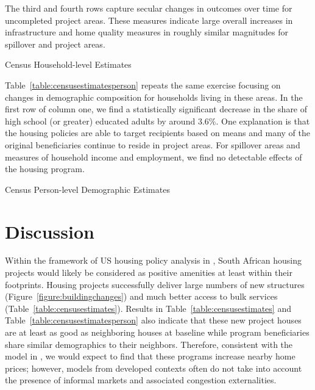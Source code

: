 \documentclass[12pt]{article}
\begin{document}
The third and fourth rows capture secular changes in outcomes over time for uncompleted project areas.  These measures indicate large overall increases in infrastructure and home quality measures in roughly similar magnitudes for spillover and project areas.

\begin{table}
\caption{Census Household-level Estimates}\label{table:censusestimates}
\centering
\begin{adjustbox}{angle=90}
\resizebox{\textheight}{!}{  

}
\end{adjustbox}
\end{table}

Table~\ref{table:censusestimatesperson} repeats the same exercise focusing on changes in demographic composition for households living in these areas.  In the first row of column one, we find a statistically significant decrease in the share of high school (or greater) educated adults by around 3.6\%.  One explanation is that the housing policies are able to target recipients based on means and many of the original beneficiaries continue to reside in project areas.  For spillover areas and measures of household income and employment, we find no detectable effects of the housing program.

\begin{table} 
\caption{Census Person-level Demographic Estimates}\label{table:censusestimatesperson}
\centering 

\end{table}


\section{Discussion}\label{section:discussion}

Within the framework of US housing policy analysis in \cite{diamond2016wants}, South African housing projects would likely be considered as positive amenities at least within their footprints.  Housing projects successfully deliver large numbers of new structures (Figure~\ref{figure:buildingchanges}) and much better access to bulk services (Table~\ref{table:censusestimates}).  Results in Table~\ref{table:censusestimates} and Table~\ref{table:censusestimatesperson} also indicate that these new project houses are at least as good as neighboring houses at baseline while program beneficiaries share similar demographics to their neighbors.  Therefore, consistent with the model in \cite{diamond2016wants}, we would expect to find that these programs increase nearby home prices; however, models from developed contexts often do not take into account the presence of informal markets and associated congestion externalities.  
\end{document}
